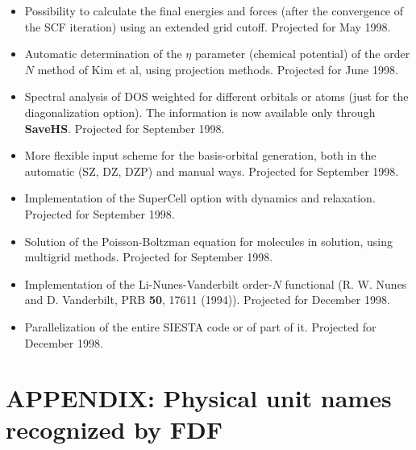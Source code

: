 \begin{itemize}

\item
Possibility to calculate the final energies and forces (after the 
convergence of the SCF iteration) using an extended grid cutoff.
Projected for May 1998.

\item
Automatic determination of the $\eta$ parameter (chemical potential)
of the order $N$ method of Kim et al, using projection methods.
Projected for June 1998.

\item
Spectral analysis of DOS weighted for different orbitals or atoms
(just for the diagonalization option). The information is now
available only through {\bf SaveHS}. Projected for September 1998.

\item
More flexible input scheme for the basis-orbital generation, both in the
automatic (SZ, DZ, DZP) and manual ways. Projected for September 1998.

\item
Implementation of the SuperCell option with dynamics and relaxation.
Projected for September 1998.

\item
Solution of the Poisson-Boltzman equation for molecules in solution,
using multigrid methods.
Projected for September 1998.

\item
Implementation of the Li-Nunes-Vanderbilt order-$N$ functional
(R. W. Nunes and D. Vanderbilt, PRB {\bf 50}, 17611 (1994)).
Projected for December 1998.

\item
Parallelization of the entire SIESTA code or of part of it.
Projected for December 1998.

\end{itemize}

\section{APPENDIX: Physical unit names recognized by FDF}

